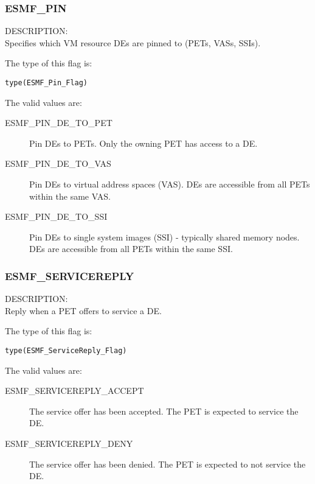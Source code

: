 

\subsubsection{ESMF\_PIN}
\label{const:pin_flag}

{\sf DESCRIPTION:\\}
Specifies which VM resource DEs are pinned to (PETs, VASs, SSIs).

The type of this flag is:

{\tt type(ESMF\_Pin\_Flag)}

The valid values are:
\begin{description}
  \item [ESMF\_PIN\_DE\_TO\_PET] 
    Pin DEs to PETs. Only the owning PET has access to a DE.
  \item [ESMF\_PIN\_DE\_TO\_VAS]
    Pin DEs to virtual address spaces (VAS). DEs are accessible from all PETs
    within the same VAS.
  \item [ESMF\_PIN\_DE\_TO\_SSI]
    Pin DEs to single system images (SSI) - typically shared memory nodes.
    DEs are accessible from all PETs within the same SSI.
\end{description}


\subsubsection{ESMF\_SERVICEREPLY}
\label{const:servicereply_flag}

{\sf DESCRIPTION:\\}
Reply when a PET offers to service a DE.

The type of this flag is:

{\tt type(ESMF\_ServiceReply\_Flag)}

The valid values are:
\begin{description}
  \item [ESMF\_SERVICEREPLY\_ACCEPT] 
    The service offer has been accepted. The PET is expected to service the DE.
  \item [ESMF\_SERVICEREPLY\_DENY]
    The service offer has been denied. The PET is expected to not service the
    DE.
\end{description}

